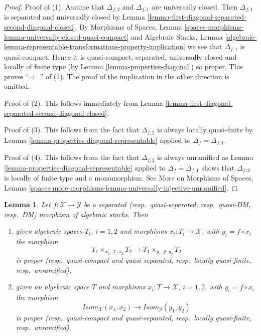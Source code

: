 \documentclass{stacks-project}
\theoremstyle{plain}
\newtheorem{lemma}[subsection]{Lemma}
\theoremstyle{definition}
\theoremstyle{remark}
\numberwithin{equation}{subsection}
\begin{document}
\begin{proof}
Proof of (1). Assume that $\Delta_{f, 2}$ and $\Delta_{f, 1}$ are
universally closed. Then $\Delta_{f, 1}$ is separated and universally
closed by
Lemma \ref{lemma-first-diagonal-separated-second-diagonal-closed}.
By
Morphisms of Spaces,
Lemma \ref{spaces-morphisms-lemma-universally-closed-quasi-compact}
and
Algebraic Stacks,
Lemma \ref{algebraic-lemma-representable-transformations-property-implication}
we see that $\Delta_{f, 1}$ is quasi-compact.
Hence it is quasi-compact, separated, universally closed and locally of
finite type (by
Lemma \ref{lemma-properties-diagonal})
so proper. This proves ``$\Leftarrow$'' of (1).
The proof of the implication in the other direction is omitted.

\medskip\noindent
Proof of (2). This follows immediately from
Lemma \ref{lemma-first-diagonal-separated-second-diagonal-closed}.

\medskip\noindent
Proof of (3). This follows from the fact that $\Delta_{f, 2}$ is always locally
quasi-finite by
Lemma \ref{lemma-properties-diagonal-representable}
applied to $\Delta_f = \Delta_{f, 1}$.

\medskip\noindent
Proof of (4). This follows from the fact that $\Delta_{f, 2}$ is always
unramified as
Lemma \ref{lemma-properties-diagonal-representable}
applied to $\Delta_f = \Delta_{f, 1}$ shows that
$\Delta_{f, 2}$ is locally of finite type and a monomorphism.
See
More on Morphisms of Spaces,
Lemma \ref{spaces-more-morphisms-lemma-universally-injective-unramified}.
\end{proof}

\begin{lemma}
\label{lemma-separated-implies-isom}
Let $f : \mathcal{X} \to \mathcal{Y}$ be a separated
(resp.\ quasi-separated, resp.\ quasi-DM, resp.\ DM)
morphism of algebraic stacks. Then
\begin{enumerate}
\item given algebraic spaces $T_i$, $i = 1, 2$ and morphisms
$x_i : T_i \to \mathcal{X}$, with $y_i = f \circ x_i$ the morphism
$$
T_1 \times_{x_1, \mathcal{X}, x_2} T_2 \longrightarrow
T_1 \times_{y_1, \mathcal{Y}, y_2} T_2
$$
is proper (resp.\ quasi-compact and quasi-separated,
resp.\ locally quasi-finite, resp.\ unramified),
\item given an algebraic space $T$ and morphisms
$x_i : T \to \mathcal{X}$, $i = 1, 2$, with $y_i = f \circ x_i$ the morphism
$$
\mathit{Isom}_\mathcal{X}(x_1, x_2) \longrightarrow
\mathit{Isom}_\mathcal{Y}(y_1, y_2)
$$
is proper (resp.\ quasi-compact and quasi-separated,
resp.\ locally quasi-finite, resp.\ unramified).
\end{enumerate}
\end{lemma}
\end{document}
